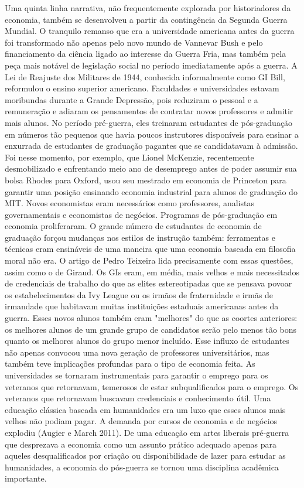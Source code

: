 \documentclass[12pt]{article}
\begin{document}
Uma quinta linha narrativa, não frequentemente explorada por historiadores da economia, também se desenvolveu a partir da contingência da Segunda Guerra Mundial. O tranquilo remanso que era a universidade americana antes da guerra foi transformado não apenas pelo novo mundo de Vannevar Bush e pelo financiamento da ciência ligado ao interesse da Guerra Fria, mas também pela peça mais notável de legislação social no período imediatamente após a guerra. A Lei de Reajuste dos Militares de 1944, conhecida informalmente como GI Bill, reformulou o ensino superior americano. Faculdades e universidades estavam moribundas durante a Grande Depressão, pois reduziram o pessoal e a remuneração e adiaram os pensamentos de contratar novos professores e admitir mais alunos. No período pré-guerra, eles treinaram estudantes de pós-graduação em números tão pequenos que havia poucos instrutores disponíveis para ensinar a enxurrada de estudantes de graduação pagantes que se candidatavam à admissão. Foi nesse momento, por exemplo, que Lionel McKenzie, recentemente desmobilizado e enfrentando meio ano de desemprego antes de poder assumir sua bolsa Rhodes para Oxford, usou seu mestrado em economia de Princeton para garantir uma posição ensinando economia industrial para alunos de graduação do MIT. Novos economistas eram necessários como professores, analistas governamentais e economistas de negócios. Programas de pós-graduação em economia proliferaram. O grande número de estudantes de economia de graduação forçou mudanças nos estilos de instrução também: ferramentas e técnicas eram ensináveis de uma maneira que uma economia baseada em filosofia moral não era. O artigo de Pedro Teixeira lida precisamente com essas questões, assim como o de Giraud. Os GIs eram, em média, mais velhos e mais necessitados de credenciais de trabalho do que as elites estereotipadas que se pensava povoar os estabelecimentos da Ivy League ou os irmãos de fraternidade e irmãs de irmandade que habitavam muitas instituições estaduais americanas antes da guerra. Esses novos alunos também eram "melhores" do que as coortes anteriores: os melhores alunos de um grande grupo de candidatos serão pelo menos tão bons quanto os melhores alunos do grupo menor incluído. Esse influxo de estudantes não apenas convocou uma nova geração de professores universitários, mas também teve implicações profundas para o tipo de economia feita. As universidades se tornaram instrumentais para garantir o emprego para os veteranos que retornavam, temerosos de estar subqualificados para o emprego. Os veteranos que retornavam buscavam credenciais e conhecimento útil. Uma educação clássica baseada em humanidades era um luxo que esses alunos mais velhos não podiam pagar. A demanda por cursos de economia e de negócios explodiu (Augier e March 2011). De uma educação em artes liberais pré-guerra que desprezava a economia como um assunto prático adequado apenas para aqueles desqualificados por criação ou disponibilidade de lazer para estudar as humanidades, a economia do pós-guerra se tornou uma disciplina acadêmica importante.
\end{document}
